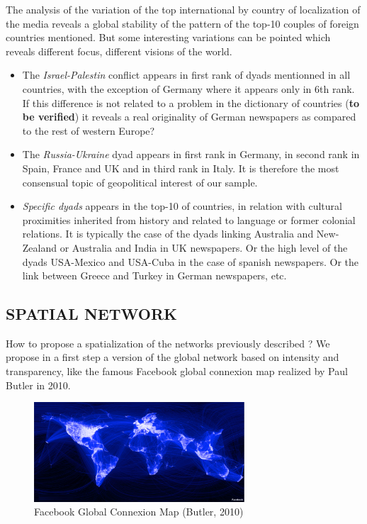 \documentclass[
]{article}
\providecommand{\tightlist}{%
  \setlength{\itemsep}{0pt}\setlength{\parskip}{0pt}}
\begin{document}
The analysis of the variation of the top international by country of
localization of the media reveals a global stability of the pattern of
the top-10 couples of foreign countries mentioned. But some interesting
variations can be pointed which reveals different focus, different
visions of the world.

\begin{itemize}
\tightlist
\item
  The \emph{Israel-Palestin} conflict appears in first rank of dyads
  mentionned in all countries, with the exception of Germany where it
  appears only in 6th rank. If this difference is not related to a
  problem in the dictionary of countries (\textbf{to be verified}) it
  reveals a real originality of German newspapers as compared to the
  rest of western Europe?
\item
  The \emph{Russia-Ukraine} dyad appears in first rank in Germany, in
  second rank in Spain, France and UK and in third rank in Italy. It is
  therefore the most consensual topic of geopolitical interest of our
  sample.
\item
  \emph{Specific dyads} appears in the top-10 of countries, in relation
  with cultural proximities inherited from history and related to
  language or former colonial relations. It is typically the case of the
  dyads linking Australia and New-Zealand or Australia and India in UK
  newspapers. Or the high level of the dyads USA-Mexico and USA-Cuba in
  the case of spanish newspapers. Or the link between Greece and Turkey
  in German newspapers, etc.
\end{itemize}

\hypertarget{spatial-network}{%
\subsection{SPATIAL NETWORK}\label{spatial-network}}

How to propose a spatialization of the networks previously described ?
We propose in a first step a version of the global network based on
intensity and transparency, like the famous Facebook global connexion
map realized by Paul Butler in 2010.

\begin{figure}
\centering
\includegraphics[width=0.7\textwidth,height=\textheight]{img/facebook_butler_map.png}
\caption{Facebook Global Connexion Map (Butler, 2010)}
\end{figure}
\end{document}
